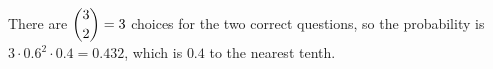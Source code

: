 There are $\dbinom32=3$ choices for the two correct questions, so the probability is $3\cdot0.6^2\cdot0.4=0.432$, which is $\boxed{0.4}$ to the nearest tenth.
